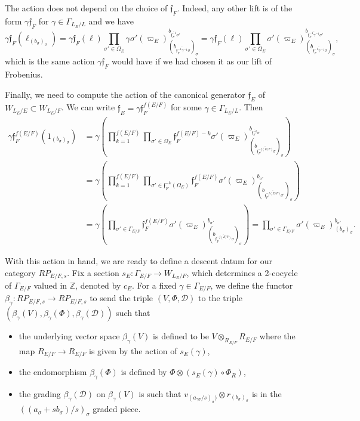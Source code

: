 \documentclass[11pt]{amsart}
\theoremstyle{definition}
\newcommand{\mc}{\mathcal}
\newcommand{\Z}{\mathbb{Z}}
\newcommand{\ov}{\overline}
\newcommand{\mf}{\mathfrak}
\begin{document}
The action does not depend on the choice of $\mf{f}_F$. Indeed, any other lift is of the form $\gamma \mf{f}_F$ for $\gamma \in \Gamma_{L_E/L}$ and we have 
\begin{equation*}
    \gamma \mf{f}_F(\ell_{(b_{\sigma})_{\sigma}}) = \gamma \mf{f}_F(\ell) \prod\limits_{\sigma' \in \Omega_E} \gamma\sigma'(\varpi_E)^{b_{\ov{\mf{f}^{-1}_F}\sigma'}}_{(b_{\ov{\mf{f}^{-1}_F\gamma^{-1}}\sigma})_{\sigma}} = \gamma\mf{f}_F(\ell) \prod\limits_{\sigma' \in \Omega_E} \sigma'(\varpi_E)^{b_{\ov{\mf{f}^{-1}_F\gamma^{-1}}\sigma'}}_{(b_{\ov{\mf{f}^{-1}_F\gamma^{-1}}\sigma})_{\sigma}},
\end{equation*}
which is the same action $\gamma\mf{f}_F$ would have if we had chosen it as our lift of Frobenius.

Finally, we need to compute the action of the canonical generator $\mf{f}_E$ of $W_{L_E/E} \subset W_{L_E/F}$. We can write $\mf{f}_E = \gamma \mf{f}^{f(E/F)}_F$ for some $\gamma \in \Gamma_{L_E/L}$. Then
\begin{align*}
    \gamma \mf{f}^{f(E/F)}_F(1_{(b_{\sigma})_{\sigma}})&=\gamma \left(\prod\limits_{k=1}^{f(E/F)} \prod\limits_{\sigma' \in \Omega_E} \mf{f}^{f(E/F) -k}_F\sigma'(\varpi_E)^{b_{\ov{\mf{f}^{-k}_F}\sigma}}_{(b_{\ov{\mf{f}^{-f(E/F)}_F}\sigma})_{\sigma}}\right)\\
    &=\gamma \left(\prod\limits^{f(E/F)}_{k=1} \prod\limits_{\sigma' \in \mf{f}^{-k}_F(\Omega_E)} \mf{f}^{f(E/F)}_F\sigma'(\varpi_E)^{b_{\sigma'}}_{(b_{\ov{\mf{f}^{-f(E/F)}_F}\sigma'})_{\sigma}}\right)\\
    &=\gamma\left(\prod\limits_{\sigma' \in \Gamma_{E/F}} \mf{f}^{f(E/F)}_F\sigma'(\varpi_E)^{b_{\sigma'}}_{(b_{\ov{\mf{f}^{-f(E/F)}_F}\sigma})_{\sigma}}\right)=\prod\limits_{\sigma' \in \Gamma_{E/F}} \sigma'(\varpi_E)^{b_{\sigma'}}_{(b_{\sigma})_{\sigma}}.
\end{align*} 

With this action in hand, we are ready to define a descent datum for our category $RP_{E/F,s}$. Fix a section $s_{E} \colon \Gamma_{E/F} \to W_{L_{E}/F}$, which determines a 2-cocycle of $\Gamma_{E/F}$ valued in $\Z$, denoted by $c_{E}$. For a fixed $\gamma \in \Gamma_{E/F}$, we define the functor $\beta_{\gamma} \colon RP_{E/F,s} \to RP_{E/F,s}$ to send the triple $(V, \Phi, \mc{D})$ to the triple $(\beta_{\gamma}(V), \beta_{\gamma}(\Phi), \beta_{\gamma}(\mc{D}))$ such that
\begin{itemize}
    \item  the underlying vector space $\beta_{\gamma}(V)$ is defined to be $V \otimes_{R_{E/F}} R_{E/F}$ where the map $R_{E/F} \to R_{E/F}$ is given by the action of $s_E(\gamma)$,
    \item the endomorphism $\beta_{\gamma}(\Phi)$ is defined by $\Phi \otimes ( s_E(\gamma) \circ \Phi_R)$,
    \item the grading $\beta_{\gamma}(\mc{D})$ on $\beta_{\gamma}(V)$ is such that $v_{(a_{\gamma \sigma}/s)_{\sigma})} \otimes r_{(b_{\sigma})_{\sigma}}$ is in the $((a_{\sigma} +sb_{\sigma})/s)_{\sigma}$ graded piece.
\end{itemize} 
\end{document}
